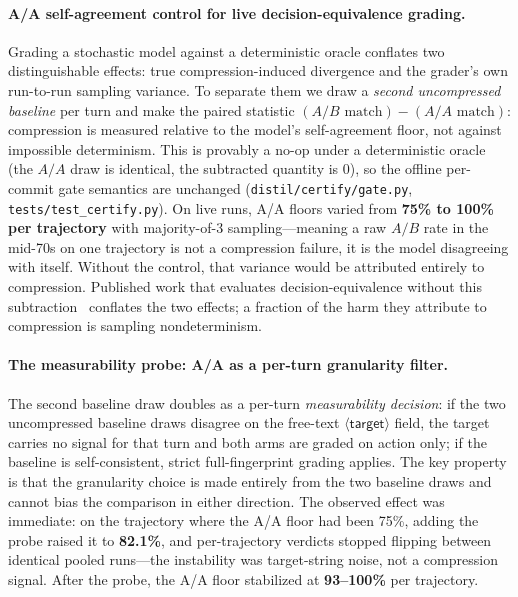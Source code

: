 \documentclass[11pt]{article}
\begin{document}
\paragraph{A/A self-agreement control for live decision-equivalence grading.}
Grading a stochastic model against a deterministic oracle conflates two distinguishable
effects: true compression-induced divergence and the grader's own run-to-run sampling
variance. To separate them we draw a \emph{second uncompressed baseline} per turn and make the
paired statistic $(A/B\text{ match}) - (A/A\text{ match})$: compression is measured relative
to the model's self-agreement floor, not against impossible determinism. This is provably a
no-op under a deterministic oracle (the $A/A$ draw is identical, the subtracted quantity is
$0$), so the offline per-commit gate semantics are unchanged
(\texttt{distil/certify/gate.py}, \texttt{tests/test\_certify.py}). On live
runs, A/A floors varied from \textbf{75\% to 100\% per trajectory} with majority-of-3
sampling---meaning a raw $A/B$ rate in the mid-70s on one trajectory is not a compression
failure, it is the model disagreeing with itself. Without the control, that variance would be
attributed entirely to compression. Published work that evaluates decision-equivalence without
this subtraction~\cite{acon,contextcodec,damc} conflates the two effects; a fraction of the
harm they attribute to compression is sampling nondeterminism.

\paragraph{The measurability probe: A/A as a per-turn granularity filter.}
The second baseline draw doubles as a per-turn \emph{measurability decision}: if the two
uncompressed baseline draws disagree on the free-text $\langle\textsf{target}\rangle$ field,
the target carries no signal for that turn and both arms are graded on \textsf{action} only;
if the baseline is self-consistent, strict full-fingerprint grading applies. The key property
is that the granularity choice is made entirely from the two baseline draws and cannot bias
the comparison in either direction. The observed effect was immediate: on the trajectory where
the A/A floor had been 75\%, adding the probe raised it to \textbf{82.1\%}, and per-trajectory
verdicts stopped flipping between identical pooled runs---the instability was target-string
noise, not a compression signal. After the probe, the A/A floor stabilized at
\textbf{93--100\%} per trajectory.
\end{document}
